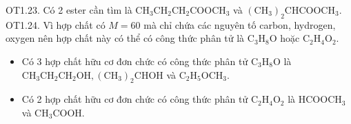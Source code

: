 \documentclass[10pt]{article}
\begin{document}
OT1.23. Có 2 ester cần tìm là $\mathrm{CH}_{3} \mathrm{CH}_{2} \mathrm{CH}_{2} \mathrm{COOCH}_{3}$ và $\left(\mathrm{CH}_{3}\right)_{2} \mathrm{CHCOOCH}_{3}$.\\
OT1.24. Vì hợp chất có $M=60$ mà chỉ chứa các nguyên tố carbon, hydrogen, oxygen nên hợp chất này có thể có công thức phân tử là $\mathrm{C}_{3} \mathrm{H}_{8} \mathrm{O}$ hoặc $\mathrm{C}_{2} \mathrm{H}_{4} \mathrm{O}_{2}$.

\begin{itemize}
  \item Có 3 hợp chất hữu cơ đơn chức có công thức phân tử $\mathrm{C}_{3} \mathrm{H}_{8} \mathrm{O}$ là $\mathrm{CH}_{3} \mathrm{CH}_{2} \mathrm{CH}_{2} \mathrm{OH},\left(\mathrm{CH}_{3}\right)_{2} \mathrm{CHOH}$ và $\mathrm{C}_{2} \mathrm{H}_{5} \mathrm{OCH}_{3}$.
  \item Có 2 hợp chất hữu cơ đơn chức có công thức phân tử $\mathrm{C}_{2} \mathrm{H}_{4} \mathrm{O}_{2}$ là $\mathrm{HCOOCH}_{3}$ và $\mathrm{CH}_{3} \mathrm{COOH}$.
\end{itemize}
\end{document}
